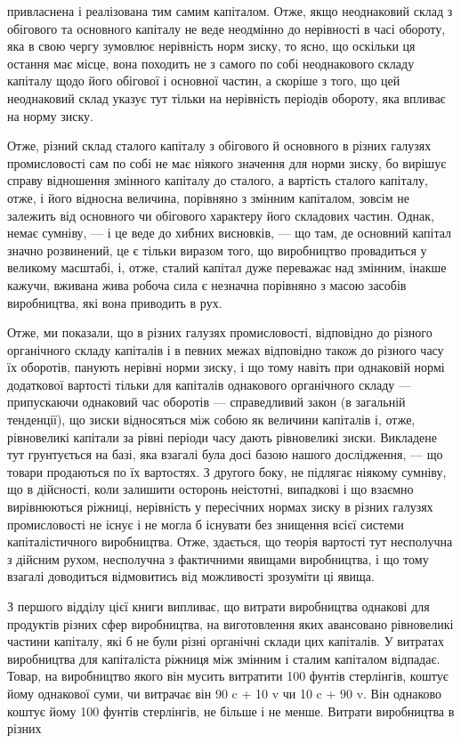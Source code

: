 привласнена і реалізована тим самим капіталом. Отже, якщо неоднаковий склад з обігового та основного
капіталу не веде неодмінно до нерівності в часі обороту, яка в свою чергу зумовлює нерівність норм
зиску, то ясно, що оскільки ця остання
має місце, вона походить не з самого по собі неоднакового
складу капіталу щодо його обігової і основної частин, а скоріше
з того, що цей неоднаковий склад указує тут тільки на нерівність періодів обороту, яка впливає на
норму зиску.

Отже, різний склад сталого капіталу з обігового й основного
в різних галузях промисловості сам по собі не має ніякого значення для норми зиску, бо вирішує
справу відношення змінного капіталу до сталого, а вартість сталого капіталу, отже, і його
відносна величина, порівняно з змінним капіталом, зовсім не залежить від основного чи обігового
характеру його складових
частин. Однак, немає сумніву, — і це веде до хибних висновків, — що там, де основний капітал значно
розвинений, це є
тільки виразом того, що виробництво провадиться у великому
масштабі, і, отже, сталий капітал дуже переважає над змінним,
інакше кажучи, вживана жива робоча сила є незначна порівняно з масою засобів виробництва, які вона
приводить в рух.

Отже, ми показали, що в різних галузях промисловості, відповідно до різного органічного складу
капіталів і в певних
межах відповідно також до різного часу їх оборотів, панують
нерівні норми зиску, і що тому навіть при однаковій нормі додаткової вартості тільки для капіталів
однакового органічного
складу — припускаючи однаковий час оборотів — справедливий
закон (в загальній тенденції), що зиски відносяться між собою
як величини капіталів і, отже, рівновеликі капітали за рівні
періоди часу дають рівновеликі зиски. Викладене тут грунтується
на базі, яка взагалі була досі базою нашого дослідження, — що товари продаються по їх вартостях. З
другого боку, не підлягає ніякому сумніву, що в дійсності, коли залишити осторонь
неістотні, випадкові і що взаємно вирівнюються ріжниці, нерівність у пересічних нормах зиску в
різних галузях промисловості не існує і не могла б існувати без знищення всієї системи
капіталістичного виробництва. Отже, здається, що теорія вартості тут несполучна з дійсним рухом,
несполучна
з фактичними явищами виробництва, і що тому взагалі доводиться відмовитись від можливості зрозуміти
ці явища.

З першого відділу цієї книги випливає, що витрати виробництва однакові для продуктів різних сфер
виробництва, на виготовлення яких авансовано рівновеликі частини капіталу, які б
не були різні органічні склади цих капіталів. У витратах виробництва для капіталіста ріжниця між
змінним і сталим капіталом
відпадає. Товар, на виробництво якого він мусить витратити
100 фунтів стерлінгів, коштує йому однакової суми, чи витрачає
він 90 c + 10 v чи 10 c + 90 v. Він однаково коштує йому 100 фунтів
стерлінгів, не більше і не менше. Витрати виробництва в різних
